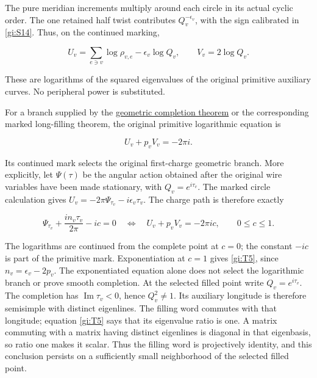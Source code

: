 The pure meridian increments multiply around each circle in its
actual cyclic order. The one retained half twist contributes
\(Q_v^{-\epsilon_v}\), with the sign calibrated in \eqref{gi:S14}.
Thus, on the continued marking,

\begin{equation}\label{gi:A1}
U_v=\sum_{e\ni v}\log\rho_{v,e}-\epsilon_v\log Q_v,\qquad
 V_v=2\log Q_v.
\end{equation}

These are logarithms of the squared eigenvalues of the original
primitive auxiliary curves. No peripheral power is substituted.

For a branch supplied by the
\href{https://sashakolpakov.github.io/murakamis_dream/notes/actual_all_circle_geometric_completion.html}{geometric completion theorem}
or the corresponding marked long-filling theorem, the original
primitive logarithmic equation is

\begin{equation}\label{gi:A2}
U_v+p_vV_v=-2\pi i.
\end{equation}

Its continued mark selects the original first-charge geometric
branch. More explicitly, let \(\Psi(\tau)\) be the angular action
obtained after the original wire variables have been made stationary,
with \(Q_v=e^{i\tau_v}\). The marked circle calculation gives
\(U_v=-2\pi\Psi_{\tau_v}-i\epsilon_v\tau_v\).
The charge path is therefore exactly

\begin{equation}\label{gi:A2a}
\Psi_{\tau_v}+\frac{in_v\tau_v}{2\pi}-ic=0
 \quad\Longleftrightarrow\quad
 U_v+p_vV_v=-2\pi ic,\qquad 0\le c\le1.
\end{equation}

The logarithms are continued from the complete point at \(c=0\);
the constant \(-ic\) is part of the primitive mark.
Exponentiation at \(c=1\) gives \eqref{gi:T5}, since
\(n_v=\epsilon_v-2p_v\). The exponentiated equation alone
does not select the logarithmic branch or prove smooth completion.
At the selected filled point write \(Q_v=e^{i\tau_v}\).
The completion has \(\operatorname{Im}\tau_v<0\), hence
\(Q_v^2\ne1\). Its auxiliary longitude is therefore semisimple
with distinct eigenlines. The filling word commutes with that longitude;
equation \eqref{gi:T5} says that its eigenvalue ratio is one. A matrix commuting
with a matrix having distinct eigenlines is diagonal in that eigenbasis,
so ratio one makes it scalar. Thus the filling word is projectively
identity, and this conclusion persists on a sufficiently small
neighborhood of the selected filled point.


